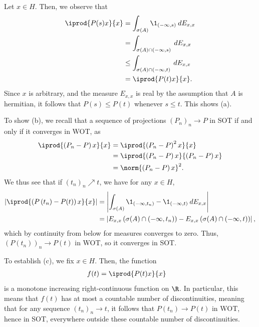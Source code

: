 \documentclass[10pt]{mypackage}
\begin{document}
\begin{solution}
  Let $x\in H$. Then, we observe that
  \begin{align*}
    \iprod{P(s)x}{x} &= \int_{\sigma(A)}^{} \1_{\left( -\infty,s \right)}\:dE_{x,x}\\
                     &= \int_{\sigma(A)\cap \left( -\infty,s \right)}^{} \:dE_{x,x}\\
                     &\leq \int_{\sigma(A)\cap \left( -\infty,t \right)}^{} \:dE_{x,x}\\
                     &= \iprod{P(t)x}{x}.
  \end{align*}
  Since $x$ is arbitrary, and the measure $E_{x,x}$ is real by the assumption that $A$ is hermitian, it follows that $P(s)\leq P(t)$ whenever $s\leq t$. This shows (a).

  To show (b), we recall that a sequence of projections $\left( P_n \right)_n\rightarrow P$ in SOT if and only if it converges in WOT, as
  \begin{align*}
    \iprod{\left( P_n-P \right)x}{x} &= \iprod{\left( P_n-P \right)^2x}{x}\\
                                     &= \iprod{\left( P_n-P \right)x}{\left( P_n-P \right)x}\\
                                     &= \norm{\left( P_n-P \right)x}^2.
  \end{align*}
  We thus see that if $\left( t_n \right)_n \nearrow t$, we have for any $x\in H$,
  \begin{align*}
    \left\vert \iprod{\left( P\left( t_n \right)-P(t) \right)x}{x} \right\vert &= \left\vert \int_{\sigma(A)}^{} \1_{(-\infty,t_n)} - \1_{(-\infty,t)}\:dE_{x,x} \right\vert\\
                                                        &= \left\vert E_{x,x}\left(\sigma(A)\cap (-\infty,t_n)\right) - E_{x,x}\left( \sigma(A)\cap \left( -\infty,t \right) \right) \right\vert,
  \end{align*}
  which by continuity from below for measures converges to zero. Thus, $\left( P\left( t_n \right) \right)_n\rightarrow P(t)$ in WOT, so it converges in SOT.

  To establish (c), we fix $x\in H$. Then, the function
  \begin{align*}
    f(t) &= \iprod{P(t)x}{x}
  \end{align*}
  is a monotone increasing right-continuous function on $\R$. In particular, this means that $f(t)$ has at most a countable number of discontinuities, meaning that for any sequence $\left( t_n \right)_n\rightarrow t$, it follows that $P\left( t_n \right)\rightarrow P(t)$ in WOT, hence in SOT, everywhere outside these countable number of discontinuities.
\end{solution}
\end{document}
